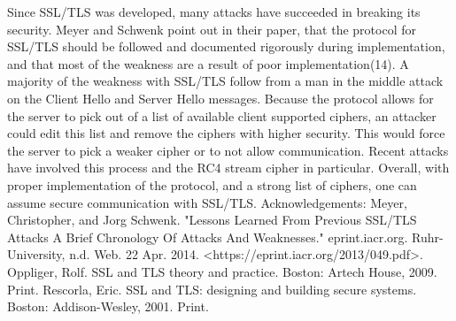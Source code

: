 	Since SSL/TLS was developed, many attacks have succeeded in breaking its security.  Meyer and Schwenk point out in their paper, that the protocol for SSL/TLS should be followed and documented rigorously during implementation, and that most of the weakness are a result of poor implementation(14).  A majority of the weakness with SSL/TLS follow from a man in the middle attack on the Client Hello and Server Hello messages.  Because the protocol allows for the server to pick out of a list of available client supported ciphers, an attacker could edit this list and remove the ciphers with higher security.  This would force the server to pick a weaker cipher or to not allow communication.  Recent attacks have involved this process and the RC4 stream cipher in particular.  Overall, with proper implementation of the protocol, and a strong list of ciphers,  one can assume secure communication with SSL/TLS.
Acknowledgements:
Meyer, Christopher, and Jorg Schwenk. "Lessons Learned From Previous SSL/TLS Attacks A Brief Chronology Of Attacks And Weaknesses." eprint.iacr.org. Ruhr-University, n.d. Web. 22 Apr. 2014. <https://eprint.iacr.org/2013/049.pdf>.
Oppliger, Rolf. SSL and TLS theory and practice. Boston: Artech House, 2009. Print.
Rescorla, Eric. SSL and TLS: designing and building secure systems. Boston: Addison-Wesley, 2001. Print.
